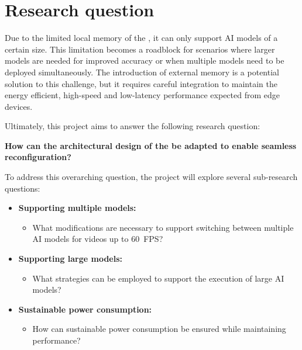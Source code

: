 \section{Research question}

Due to the limited local memory of the \graicore{}, it can only support AI models of a certain size.
This limitation becomes a roadblock for scenarios where larger models are needed for improved accuracy or when multiple models need to be deployed simultaneously.
The introduction of external memory is a potential solution to this challenge, but it requires careful integration to maintain the energy efficient, high-speed and low-latency performance expected from edge devices.

Ultimately, this project aims to answer the following research question:

\textbf{How can the architectural design of the \graicore{} be adapted to enable seamless reconfiguration?}

To address this overarching question, the project will explore several sub-research questions:

\begin{itemize}
    \item \textbf{Supporting multiple models:}
    \begin{itemize}
        \item What modifications are necessary to support switching between multiple AI models for videos up to \SI{60}{FPS}?
    \end{itemize}
    \item \textbf{Supporting large models:}
    \begin{itemize}
        \item What strategies can be employed to support the execution of large AI models?
    \end{itemize}
    \item \textbf{Sustainable power consumption:}
    \begin{itemize}
        \item How can sustainable power consumption be ensured while maintaining performance?
    \end{itemize}
\end{itemize}
